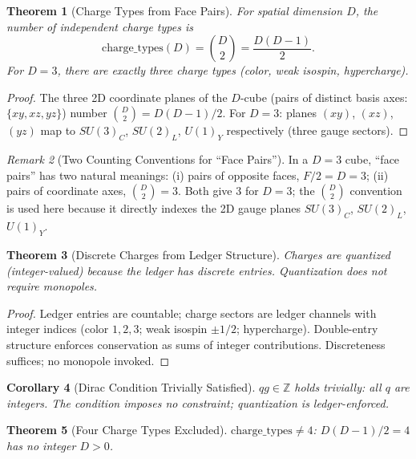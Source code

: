 \documentclass[12pt,a4paper]{article}
\newtheorem{theorem}{Theorem}[section]
\newtheorem{corollary}[theorem]{Corollary}
\theoremstyle{definition}
\theoremstyle{remark}
\newtheorem{remark}[theorem]{Remark}
\begin{document}
\begin{theorem}[Charge Types from Face Pairs]
\label{thm:charge-types}
For spatial dimension $D$, the number of independent charge types is
\begin{equation}
\mathrm{charge\_types}(D) = \binom{D}{2} = \frac{D(D-1)}{2}.
\end{equation}
For $D = 3$, there are exactly three charge types (color, weak
isospin, hypercharge).
\end{theorem}

\begin{proof}
The three 2D coordinate planes of the $D$-cube (pairs of distinct
basis axes: $\{xy, xz, yz\}$) number $\binom{D}{2} = D(D-1)/2$.
For $D = 3$: planes $(xy)$, $(xz)$, $(yz)$ map to $SU(3)_C$,
$SU(2)_L$, $U(1)_Y$ respectively (three gauge sectors).
\end{proof}

\begin{remark}[Two Counting Conventions for ``Face Pairs'']
\label{rem:conventions}
In a $D=3$ cube, ``face pairs'' has two natural meanings: (i) pairs
of opposite faces, $F/2 = D = 3$; (ii) pairs of coordinate axes,
$\binom{D}{2} = 3$.  Both give 3 for $D = 3$; the $\binom{D}{2}$
convention is used here because it directly indexes the 2D gauge
planes $SU(3)_C$, $SU(2)_L$, $U(1)_Y$.
\end{remark}

\begin{theorem}[Discrete Charges from Ledger Structure]
\label{thm:discrete-charges}
Charges are quantized (integer-valued) because the ledger has discrete
entries.  Quantization does not require monopoles.
\end{theorem}

\begin{proof}
Ledger entries are countable; charge sectors are ledger channels with
integer indices (color $1,2,3$; weak isospin $\pm 1/2$; hypercharge).
Double-entry structure enforces conservation as sums of integer
contributions.  Discreteness suffices; no monopole invoked.
\end{proof}

\begin{corollary}[Dirac Condition Trivially Satisfied]
\label{cor:dirac}
$qg \in \mathbb{Z}$ holds trivially: all $q$ are integers.  The
condition imposes no constraint; quantization is ledger-enforced.
\end{corollary}

\begin{theorem}[Four Charge Types Excluded]
\label{thm:four-excluded}
$\mathrm{charge\_types} \neq 4$: $D(D-1)/2 = 4$ has no integer $D > 0$.
\end{theorem}
\end{document}
